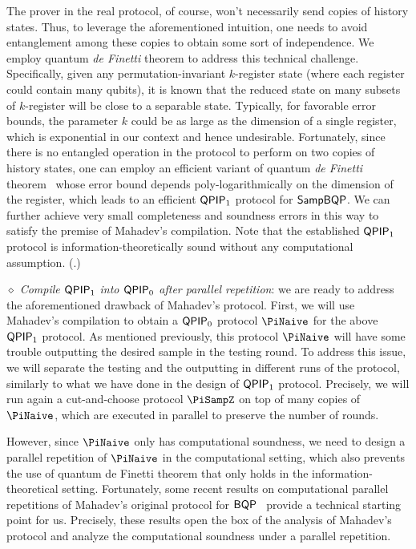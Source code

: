 The prover in the real protocol, of course, won't necessarily send copies of history states. Thus, to leverage the aforementioned intuition, one needs to avoid entanglement among these copies to obtain some sort of independence. 
We employ quantum \emph{de Finetti} theorem to address this technical challenge.
Specifically, given any permutation-invariant $k$-register state (where each register could contain many qubits), it is known that the reduced state on many subsets of $k$-register will be close to a separable state. 
Typically, for favorable error bounds, the parameter $k$ could be as large as the dimension of a single register, which is exponential in our context and hence undesirable. 
Fortunately, since there is no entangled operation in the protocol to perform on two copies of history states, one can employ an efficient variant of quantum \emph{de Finetti} theorem~\cite{Brandao2017} whose error bound depends poly-logarithmically on the dimension of the register, which leads to an efficient $\operatorname{\mathsf{QPIP}}_1$ protocol for $\operatorname{\mathsf{SampBQP}}$. 
We can further achieve very small completeness and soundness errors in this way to satisfy the premise of Mahadev's compilation.  
Note that the established $\operatorname{\mathsf{QPIP}}_1$ protocol is information-theoretically sound without any computational assumption.  (.)

\vspace{2mm} \noindent  \emph{$\diamond$ Compile $\operatorname{\mathsf{QPIP}}_1$ into $\operatorname{\mathsf{QPIP}}_0$ after parallel repetition}: we are ready to address the aforementioned drawback of Mahadev's protocol. First, we will use Mahadev's compilation to obtain a $\operatorname{\mathsf{QPIP}}_0$ protocol $\PiNaive$ for the above $\operatorname{\mathsf{QPIP}}_1$ protocol.  As mentioned previously, this protocol $\PiNaive$ will have some trouble outputting the desired sample in the testing round. 
To address this issue, we will separate the testing and the outputting in different runs of the protocol, similarly to what we have done in the design of $\operatorname{\mathsf{QPIP}}_1$ protocol. 
Precisely, we will run again a cut-and-choose protocol $\PiSampZ$ on top of many copies of $\PiNaive$, which are executed in parallel to preserve the number of rounds.

However, since $\PiNaive$ only has computational soundness, we need to design a parallel repetition of $\PiNaive$ in the computational setting, which also prevents the use of quantum de Finetti theorem that only holds in the information-theoretical setting. 
Fortunately,  some recent results on computational parallel repetitions of Mahadev's original protocol for $\operatorname{\mathsf{BQP}}$~\cite{arXiv:AlaChiHun19, arXiv:ChiaChungYam19} provide a technical starting point for us. 
Precisely, these results open the box of the analysis of Mahadev's protocol and analyze the computational soundness under a parallel repetition. 

